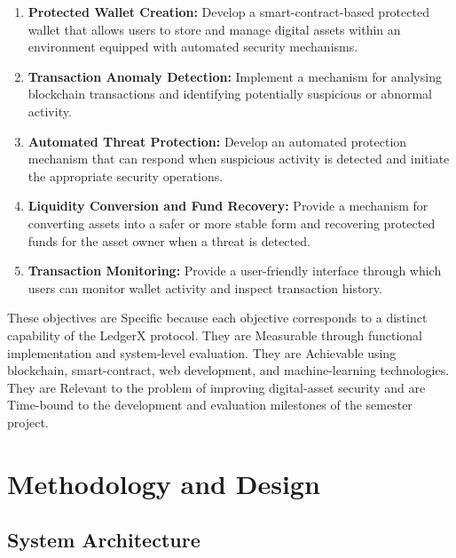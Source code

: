 \documentclass{tietreport}
\begin{document}
\begin{enumerate}
  \item \textbf{Protected Wallet Creation:}
  Develop a smart-contract-based protected wallet that allows users
  to store and manage digital assets within an environment equipped
  with automated security mechanisms.

  \item \textbf{Transaction Anomaly Detection:}
  Implement a mechanism for analysing blockchain transactions and
  identifying potentially suspicious or abnormal activity.

  \item \textbf{Automated Threat Protection:}
  Develop an automated protection mechanism that can respond when
  suspicious activity is detected and initiate the appropriate
  security operations.

  \item \textbf{Liquidity Conversion and Fund Recovery:}
  Provide a mechanism for converting assets into a safer or more
  stable form and recovering protected funds for the asset owner
  when a threat is detected.

  \item \textbf{Transaction Monitoring:}
  Provide a user-friendly interface through which users can monitor
  wallet activity and inspect transaction history.
\end{enumerate}

These objectives are Specific because each objective corresponds to a
distinct capability of the LedgerX protocol. They are Measurable
through functional implementation and system-level evaluation. They
are Achievable using blockchain, smart-contract, web development,
and machine-learning technologies. They are Relevant to the problem
of improving digital-asset security and are Time-bound to the
development and evaluation milestones of the semester project.


\chapter{Methodology and Design}

\section{System Architecture}
\end{document}
